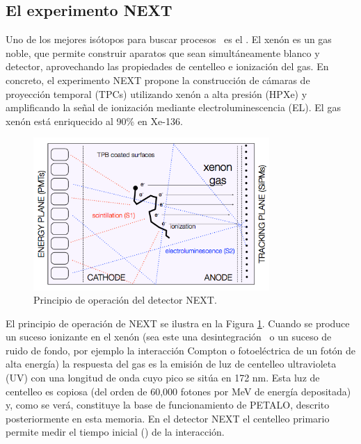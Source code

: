 \subsection*{El experimento NEXT}

Uno de los mejores isótopos para buscar procesos \bbonu\ es el \XE. El xenón es un gas noble, que permite construir aparatos que sean simultáneamente blanco y  detector, aprovechando las propiedades de centelleo e ionización del gas. En concreto, el experimento NEXT propone la construcción de cámaras de proyección temporal (TPCs) utilizando xenón a alta presión (HPXe) y amplificando la señal de ionización mediante electroluminescencia (EL). El gas xenón está enriquecido al 90\% en Xe-136. 


\begin{figure}
\centering
\includegraphics[width=0.8\textwidth]{img/EL.png}
\caption{\small Principio de operación del detector NEXT. 
} \label{fig.EL}
\end{figure}
                                    
El principio de operación de NEXT se ilustra en la Figura \ref{fig.EL}. Cuando se produce un suceso ionizante en el xenón (sea este una desintegración \bb\ o un suceso de ruido de fondo, por ejemplo la interacción Compton o fotoeléctrica de un fotón de alta energía) la respuesta del gas es la emisión de luz de centelleo ultravioleta (UV) con una longitud de onda cuyo pico se sitúa en 172 nm. Esta luz de centelleo es copiosa (del orden de 60,000 fotones por MeV de energía depositada) y, como se verá, constituye la base de funcionamiento de PETALO, descrito posteriormente en esta memoria. En el detector NEXT el centelleo primario permite medir el tiempo inicial (\tto) de la interacción.

